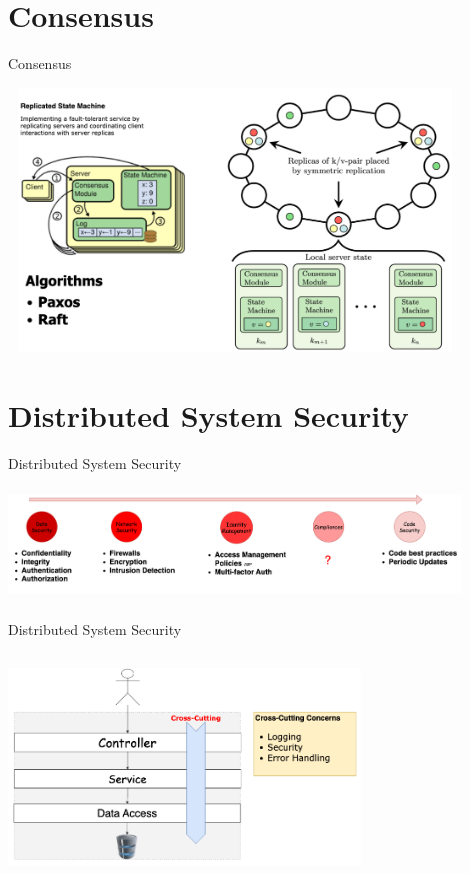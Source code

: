 \documentclass{beamer}
\begin{document}
\section{Consensus}
\begin{frame}{Consensus}
		\begin{center}
   	 		\includegraphics[width=0.9\textwidth, height=70mm, scale=1]{img/consensus.PNG}
  		\end{center}
\end{frame}

\section{Distributed System Security}
\begin{frame}{Distributed System Security}
  \begin{center}
   	 		\includegraphics[width=0.9\textwidth, height=30mm, scale=1]{img/security.PNG}
  \end{center}
\end{frame}
\begin{frame}{Distributed System Security}
		\begin{center}
   	 		\includegraphics[width=0.7\textwidth, height=60mm, scale=1]{img/cross-cutting.png}
  		\end{center}
\end{frame}
\end{document}
